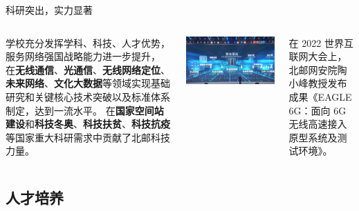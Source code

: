 \documentclass[aspectratio=169, utf8, fontset=windows]{beamer}
\begin{document}
\begin{frame}{科研突出，实力显著}
    \begin{columns}
        \setlength{\parindent}{2em}

        学校充分发挥学科、科技、人才优势，服务网络强国战略能力进一步提升，
        在\textcolor{Fore}{\textbf{无线通信}}、\textcolor{Fore}{\textbf{光通信}}、\textcolor{Fore}{\textbf{无线网络定位}}、
        \textcolor{Fore}{\textbf{未来网络}}、\textcolor{Fore}{\textbf{文化大数据}}等领域实现基础研究和关键核心技术突破以及标准体系制定，达到一流水平。
        在\textcolor{Fore}{\textbf{国家空间站建设}}和\textcolor{Fore}{\textbf{科技冬奥}}、\textcolor{Fore}{\textbf{科技扶贫}}、\textcolor{Fore}{\textbf{科技抗疫}}等国家重大科研需求中贡献了北邮科技力量。

        \includegraphics[width=\textwidth]{./resources/9.png}
        \setlength{\parindent}{2em}
        \scriptsize

        在 2022 世界互联网大会上，北邮网安院陶小峰教授发布成果《EAGLE 6G：面向 6G 无线高速接入原型系统及测试环境》。
    \end{columns}
\end{frame}

\subsection*{人才培养}
\end{document}
